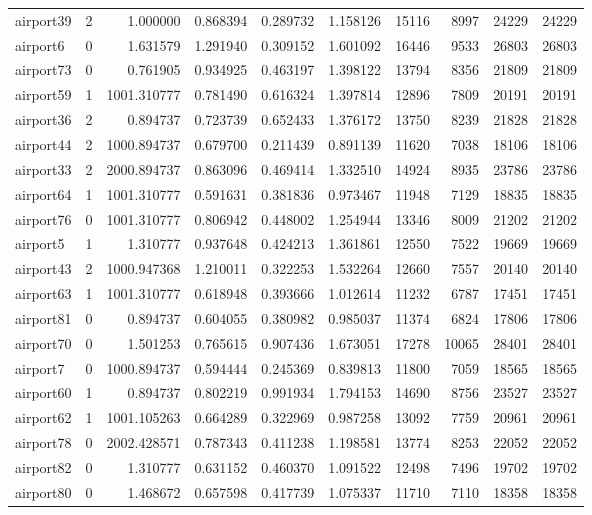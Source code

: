 \begin{longtable}{|l|r|r|r|r|r|r|r|r|r|}
airport39 & 2 & 1.000000 & 0.868394 & 0.289732 & 1.158126 & 15116 & 8997 & 24229 & 24229 \\
airport6 & 0 & 1.631579 & 1.291940 & 0.309152 & 1.601092 & 16446 & 9533 & 26803 & 26803 \\
airport73 & 0 & 0.761905 & 0.934925 & 0.463197 & 1.398122 & 13794 & 8356 & 21809 & 21809 \\
airport59 & 1 & 1001.310777 & 0.781490 & 0.616324 & 1.397814 & 12896 & 7809 & 20191 & 20191 \\
airport36 & 2 & 0.894737 & 0.723739 & 0.652433 & 1.376172 & 13750 & 8239 & 21828 & 21828 \\
airport44 & 2 & 1000.894737 & 0.679700 & 0.211439 & 0.891139 & 11620 & 7038 & 18106 & 18106 \\
airport33 & 2 & 2000.894737 & 0.863096 & 0.469414 & 1.332510 & 14924 & 8935 & 23786 & 23786 \\
airport64 & 1 & 1001.310777 & 0.591631 & 0.381836 & 0.973467 & 11948 & 7129 & 18835 & 18835 \\
airport76 & 0 & 1001.310777 & 0.806942 & 0.448002 & 1.254944 & 13346 & 8009 & 21202 & 21202 \\
airport5 & 1 & 1.310777 & 0.937648 & 0.424213 & 1.361861 & 12550 & 7522 & 19669 & 19669 \\
airport43 & 2 & 1000.947368 & 1.210011 & 0.322253 & 1.532264 & 12660 & 7557 & 20140 & 20140 \\
airport63 & 1 & 1001.310777 & 0.618948 & 0.393666 & 1.012614 & 11232 & 6787 & 17451 & 17451 \\
airport81 & 0 & 0.894737 & 0.604055 & 0.380982 & 0.985037 & 11374 & 6824 & 17806 & 17806 \\
airport70 & 0 & 1.501253 & 0.765615 & 0.907436 & 1.673051 & 17278 & 10065 & 28401 & 28401 \\
airport7 & 0 & 1000.894737 & 0.594444 & 0.245369 & 0.839813 & 11800 & 7059 & 18565 & 18565 \\
airport60 & 1 & 0.894737 & 0.802219 & 0.991934 & 1.794153 & 14690 & 8756 & 23527 & 23527 \\
airport62 & 1 & 1001.105263 & 0.664289 & 0.322969 & 0.987258 & 13092 & 7759 & 20961 & 20961 \\
airport78 & 0 & 2002.428571 & 0.787343 & 0.411238 & 1.198581 & 13774 & 8253 & 22052 & 22052 \\
airport82 & 0 & 1.310777 & 0.631152 & 0.460370 & 1.091522 & 12498 & 7496 & 19702 & 19702 \\
airport80 & 0 & 1.468672 & 0.657598 & 0.417739 & 1.075337 & 11710 & 7110 & 18358 & 18358 \\

\end{longtable}
